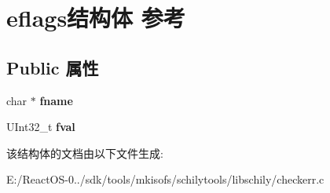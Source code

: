 \hypertarget{structeflags}{}\section{eflags结构体 参考}
\label{structeflags}
\subsection*{Public 属性}
\begin{DoxyCompactItemize}
\item 
\mbox{\label{structeflags_a3380bfa94f3b483faf9db3eb5709c73d}} 
char $\ast$ {\bfseries fname}
\item 
\mbox{\label{structeflags_adbb44922aee77accef77389a5ed717a9}} 
U\+Int32\+\_\+t {\bfseries fval}
\end{DoxyCompactItemize}


该结构体的文档由以下文件生成\+:\begin{DoxyCompactItemize}
\item 
E\+:/\+React\+O\+S-\/0../sdk/tools/mkisofs/schilytools/libschily/checkerr.\+c\end{DoxyCompactItemize}
